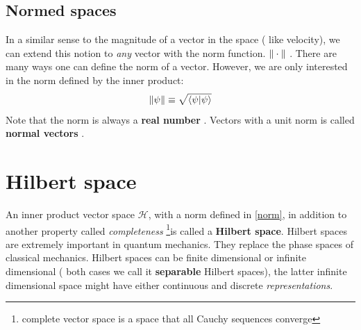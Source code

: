 \subsection{Normed spaces}
In a similar sense to the magnitude of a vector in the space ( like velocity), we can extend this notion to \textit{any} vector with the norm function. $ \Arrowvert \cdot \Arrowvert$ . There are many ways one can define the norm of a vector. However, we are only interested in the norm defined by the inner product:
\begin{equation}
\Arrowvert \psi  \Arrowvert \equiv\sqrt{\langle \psi | \psi \rangle}
\label{norm}
\end{equation}
Note that the norm is always a\textbf{ real number }. Vectors with a unit norm is called \textbf{normal vectors }.
\section{Hilbert space}
An inner product vector space $ \mathcal{H}$, with a norm defined in \eqref{norm}, in addition to another property called \textit{completeness} \footnote{ complete vector space is a space that all Cauchy sequences converge}is called a \textbf{Hilbert space}. Hilbert spaces are extremely important in quantum mechanics. They replace the phase spaces of classical mechanics. Hilbert spaces can be finite dimensional or  infinite dimensional ( both cases we call it \textbf{separable} Hilbert spaces), the latter infinite dimensional space might have either continuous and discrete \textit{representations}. \\
